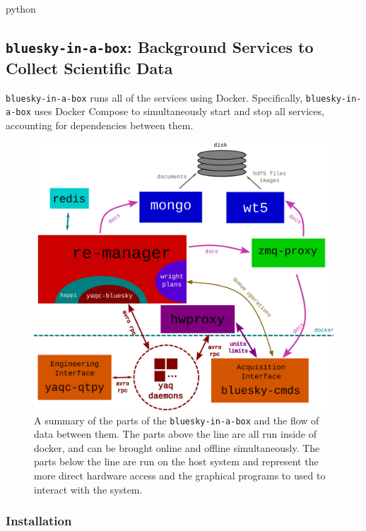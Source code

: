 \begin{codefragment}{python}
\end{codefragment}


\subsection{\texttt{bluesky-in-a-box}: Background Services to Collect Scientific Data}

\texttt{bluesky-in-a-box} runs all of the services using Docker\cite{}.
Specifically, \texttt{bluesky-in-a-box} uses Docker Compose\cite{} to simultaneously start and stop all services, accounting for dependencies between them.

\begin{figure}
\includegraphics[width=7in]{"acquisition/images/bluesky-in-a-box-architecture"}
\caption[\texttt{bluesky-in-a-box} architecture]{
A summary of the parts of the \texttt{bluesky-in-a-box} and the flow of data between them.
The parts above the line are all run inside of docker, and can be brought online and offline simultaneously.
The parts below the line are run on the host system and represent the more direct hardware access and the graphical programs to used to interact with the system.
}
\label{acq:fig:biab_arch}
\end{figure}

\subsubsection{Installation}
\label{biab-install}

